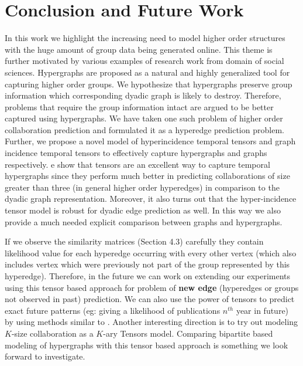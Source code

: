 \documentclass{sig-alternate}
\begin{document}
\section{Conclusion and  Future Work}

In this work we highlight the increasing need to model higher order structures with the huge amount of group data being generated online. This theme is further motivated by various examples of research work from domain of social sciences. Hypergraphs are proposed as a natural and highly generalized tool for capturing higher order groups. We hypothesize that hypergraphs preserve group information which corresponding dyadic graph is likely to destroy. Therefore, problems that require the group information intact are argued to be better captured using hypergraphs. We have taken one such problem of higher order collaboration prediction and formulated it as a hyperedge prediction problem. Further, we propose a novel model of hyperincidence temporal tensors and graph incidence temporal tensors to effectively capture hypergraphs and graphs respectively. e show that tensors are an excellent way to capture temporal hypergraphs since they perform much better in predicting collaborations of size greater than three (in general higher order hyperedges) in comparison to the dyadic graph representation. Moreover, it also turns out that the hyper-incidence tensor model is robust for dyadic edge prediction as well. In this way we also provide a much needed explicit comparison between graphs and hypergraphs. 

If we observe the similarity matrices (Section 4.3) carefully they contain likelihood value for each hyperedge occurring with every other vertex (which also includes vertex which were previously not part of the group represented by this hyperedge). Therefore, in the future we can work on extending our experiments using this tensor based approach for problem of \textbf{new edge} (hyperedges or groups not observed in past) prediction. We can also use the power of tensors to predict exact future patterns (eg: giving a likelihood of publications $n^{th}$ year in future) by using methods similar to \cite{kolda11}. Another interesting direction is to try out modeling $K$-size collaboration as a $K$-ary Tensors model. Comparing bipartite based modeling of hypergraphs with this tensor based approach is something we look forward to investigate.
\end{document}
